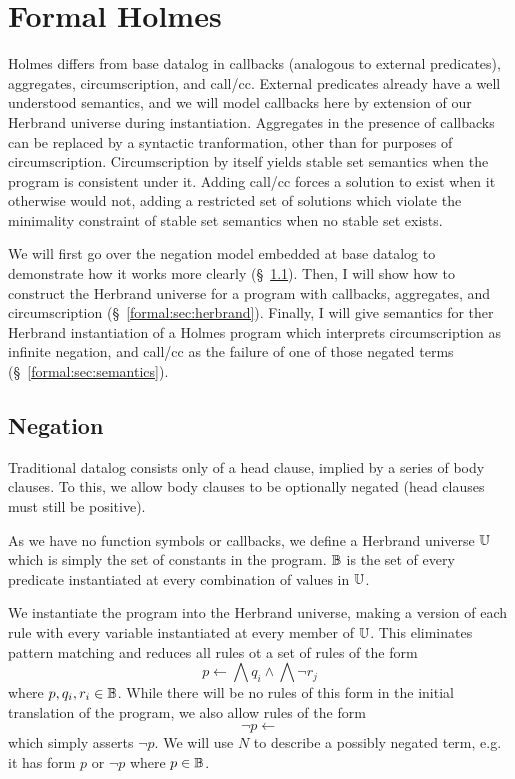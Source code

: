 
\chapter{Formal Holmes}
\label{chap:formal}
Holmes differs from base datalog in callbacks (analogous to external predicates), aggregates, circumscription, and call/cc.
External predicates already have a well understood semantics, and we will model callbacks here by extension of our Herbrand universe during instantiation.
Aggregates in the presence of callbacks can be replaced by a syntactic tranformation, other than for purposes of circumscription.
Circumscription by itself yields stable set semantics when the program is consistent under it.
Adding call/cc forces a solution to exist when it otherwise would not, adding a restricted set of solutions which violate the minimality constraint of stable set semantics when no stable set exists.

We will first go over the negation model embedded at base datalog to demonstrate how it works more clearly (\S~\ref{formal:sec:negation}).
Then, I will show how to construct the Herbrand universe for a program with callbacks, aggregates, and circumscription (\S~\ref{formal:sec:herbrand}).
Finally, I will give semantics for ther Herbrand instantiation of a Holmes program which interprets circumscription as infinite negation, and call/cc as the failure of one of those negated terms (\S~\ref{formal:sec:semantics}).
\section{Negation}
\label{formal:sec:negation}
Traditional datalog consists only of a head clause, implied by a series of body clauses.
To this, we allow body clauses to be optionally negated (head clauses must still be positive).

As we have no function symbols or callbacks, we define a Herbrand universe $\mathbb{U}$ which is simply the set of constants in the program.
$\mathbb{B}$ is the set of every predicate instantiated at every combination of values in $\mathbb{U}$.

We instantiate the program into the Herbrand universe, making a version of each rule with every variable instantiated at every member of $\mathbb{U}$.
This eliminates pattern matching and reduces all rules ot a set of rules of the form
\[
	p \leftarrow \bigwedge q_i \wedge \bigwedge \neg r_j
\]
where $p, q_i, r_i \in \mathbb{B}$.
While there will be no rules of this form in the initial translation of the program, we also allow rules of the form
\[
	\neg p \leftarrow
\]
which simply asserts $\neg p$.
We will use $N$ to describe a possibly negated term, e.g. it has form $p$ or $\neg p$ where $p \in \mathbb{B}$.

